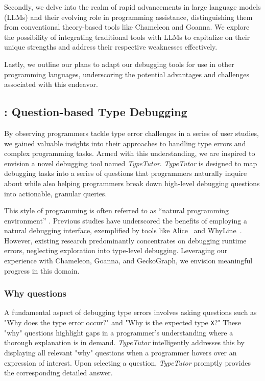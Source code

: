 Secondly, we delve into the realm of rapid advancements in large language models (LLMs) and their evolving role in programming assistance, distinguishing them from conventional theory-based tools like Chameleon and Goanna. We explore the possibility of integrating traditional tools with LLMs to capitalize on their unique strengths and address their respective weaknesses effectively.

Lastly, we outline our plans to adapt our debugging tools for use in other programming languages, underscoring the potential advantages and challenges associated with this endeavor.

\subsection{\typetutor: Question-based Type Debugging}
By observing programmers tackle type error challenges in a series of user studies, we gained valuable insights into their approaches to handling type errors and complex programming tasks. Armed with this understanding, we are inspired to envision a novel debugging tool named \textit{TypeTutor}. \textit{TypeTutor} is designed to map debugging tasks into a series of questions that programmers naturally inquire about while also helping programmers break down high-level debugging questions into actionable, granular queries.

This style of programming is often referred to as ``natural programming environment'' \cite{Myers2004-fy}. Previous studies have underscored the benefits of employing a natural debugging interface, exemplified by tools like Alice~\cite{Conway2000-nn} and WhyLine~\cite{Ko2009-uf}. However, existing research predominantly concentrates on debugging runtime errors, neglecting exploration into type-level debugging.  Leveraging our experience with Chameleon, Goanna, and GeckoGraph, we envision meaningful progress in this domain.


\subsubsection{Why questions}

A fundamental aspect of debugging type errors involves asking questions such as "Why does the type error occur?" and "Why is the expected type \texttt{X}?" These "why" questions highlight gaps in a programmer's understanding where a thorough explanation is in demand. \textit{TypeTutor} intelligently addresses this by displaying all relevant "why" questions when a programmer hovers over an expression of interest. Upon selecting a question, \textit{TypeTutor} promptly provides the corresponding detailed answer.



